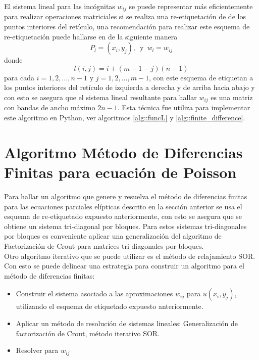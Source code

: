 \documentclass[a4paper]{article}
\begin{document}
El sistema lineal para las incógnitas $w_{ij}$ se puede representar más eficientemente para realizar operaciones matriciales si se realiza una re-etiquetación de de los puntos interiores del retículo, una recomendación para realizar este esquema de re-etiquetación puede hallarse en \cite{Varga} de la siguiente manera
\begin{equation}
P_l=(x_i,y_j), \,\,\, \text{y}\,\,\, w_l=w_{ij}
\end{equation}
donde
\begin{equation}\label{eq::relabeling_function}
l(i,j)=i+(m-1-j)(n-1)
\end{equation} 
para cada $i=1,2,\hdots,n-1$ y $j=1,2,\hdots,m-1$, con este esquema de etiquetan a los puntos interiores del retículo de izquierda a derecha y de arriba hacia abajo y con esto se asegura que el sistema lineal resultante para hallar $w_{ij}$ es una matriz con bandas de ancho máximo $2n-1$. Esta técnica fue utiliza para implementar este algoritmo en Python, ver algoritmos \ref{alg::funcL} y \ref{alg::finite_difference}.



\section{Algoritmo Método de Diferencias Finitas para ecuación de Poisson}
Para hallar un algoritmo que genere y resuelva el método de diferencias finitas para las ecuaciones parciales elípticas descrito en la sección anterior se usa el esquema de re-etiquetado expuesto anteriormente, con esto se asegura que se obtiene un sistema tri-diagonal por bloques. Para estos sistemas tri-diagonales por bloques es conveniente aplicar una generalización del algoritmo de Factorización de Crout \cite{Varga} para matrices tri-diagonales por bloques.\\
Otro algoritmo iterativo que se puede utilizar es el método de relajamiento SOR. Con esto se puede delinear una estrategia para construir un algoritmo para el método de diferencias finitas:
\begin{itemize}
\item Construir el sistema asociado a las aproximaciones $w_{ij}$ para $u(x_i,y_j)$, utilizando el esquema de etiquetado expuesto anteriormente.
\item Aplicar un método de resolución de sistemas lineales: Generalización de factorización de Crout, método iterativo SOR.
\item Resolver para $w_{ij}$
\end{itemize}
\end{document}
